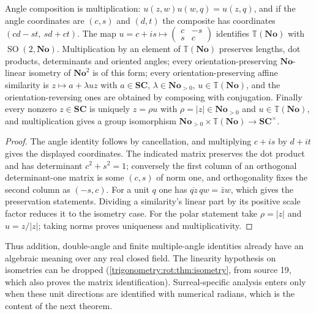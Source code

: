 \documentclass[11pt,letterpaper]{article}
\numberwithin{equation}{section}
\theoremstyle{definition}
\theoremstyle{remark}
\newcommand{\No}{\mathbf{No}}
\newcommand{\SC}{\mathbf{SC}}
\newcommand{\TT}{\mathbb T}
\newcommand{\SO}{\operatorname{SO}}
\begin{document}
\begin{proposition}\label{trigonometry:prop:rotation}
Angle composition is multiplication: $u(z,w)u(w,q)=u(z,q)$, and if the angle coordinates are
$(c,s)$ and $(d,t)$ the composite has coordinates $(cd-st,\ sd+ct)$. The map
$u=c+is\mapsto\left(\begin{smallmatrix}c&-s\\ s&c\end{smallmatrix}\right)$ identifies $\TT(\No)$
with $\SO(2,\No)$. Multiplication by an element of $\TT(\No)$ preserves lengths, dot products,
determinants and oriented angles; every orientation-preserving $\No$-linear isometry of $\No^2$ is
of this form; every orientation-preserving affine similarity is $z\mapsto a+\lambda uz$ with
$a\in\SC$, $\lambda\in\No_{>0}$, $u\in\TT(\No)$, and the orientation-reversing ones are obtained by
composing with conjugation. Finally every nonzero $z\in\SC$ is uniquely $z=\rho u$ with
$\rho=|z|\in\No_{>0}$ and $u\in\TT(\No)$, and multiplication gives a group isomorphism
$\No_{>0}\times\TT(\No)\to\SC^\times$.
\end{proposition}
\begin{proof}
The angle identity follows by cancellation, and multiplying $c+is$ by $d+it$ gives the displayed
coordinates. The indicated matrix preserves the dot product and has determinant $c^2+s^2=1$;
conversely the first column of an orthogonal determinant-one matrix is some $(c,s)$ of norm one,
and orthogonality fixes the second column as $(-s,c)$. For a unit $q$ one has
$\overline{qz}\,qw=\bar zw$, which gives the preservation statements. Dividing a similarity's
linear part by its positive scale factor reduces it to the isometry case. For the polar statement
take $\rho=|z|$ and $u=z/|z|$; taking norms proves uniqueness and multiplicativity.
\end{proof}
Thus addition, double-angle and finite multiple-angle identities already have an algebraic meaning
over any real closed field. The linearity hypothesis on isometries can be dropped
(\cref{trigonometry:rot:thm:isometry}, from source 19, which also proves the matrix identification). Surreal-specific analysis enters only when these unit directions are
identified with numerical radians, which is the content of the next theorem.
\end{document}

